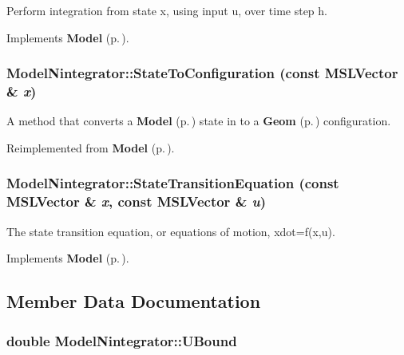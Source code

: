Perform integration from state x, using input u, over time step h.



Implements {\bf Model} {\rm (p.\,\pageref{classModel_a5})}.
\subsubsection{ Model\-Nintegrator::State\-To\-Configuration (const {\bf MSLVector} \& {\em x})\hspace{0.3cm}{\tt  [virtual]}}\label{classModelNintegrator_a2}


A method that converts a {\bf Model} {\rm (p.\,\pageref{classModel})} state in to a {\bf Geom} {\rm (p.\,\pageref{classGeom})} configuration.



Reimplemented from {\bf Model} {\rm (p.\,\pageref{classModel_a8})}.
\subsubsection{ Model\-Nintegrator::State\-Transition\-Equation (const {\bf MSLVector} \& {\em x}, const {\bf MSLVector} \& {\em u})\hspace{0.3cm}{\tt  [virtual]}}\label{classModelNintegrator_a4}


The state transition equation, or equations of motion, xdot=f(x,u).



Implements {\bf Model} {\rm (p.\,\pageref{classModel_a3})}.

\subsection{Member Data Documentation}
\subsubsection{\setlength{\rightskip}{0pt plus 5cm}double Model\-Nintegrator::UBound}\label{classModelNintegrator_m0}



